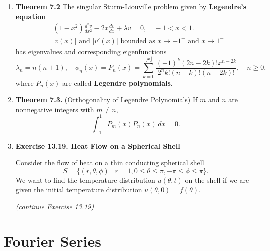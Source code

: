 \begin{enumerate}

\item \textbf{Theorem 7.2} The singular Sturm-Liouville problem given by \textbf{Legendre's equation}
\[
\begin{aligned}
& (1-x^{2})\frac{d^{2}v}{dx^{2}}-2x\frac{dv}{dx}+\lambda  v=0, \quad -1<x<1. \\
& |v(x)| \text{  and  } |v'(x)| \text{  bounded as  } x\to -1^{+} \text{  and  } x\to 1^{-}
\end{aligned}
\]
has eigenvalues and corresponding eigenfunctions
\[\lambda_{n}= n(n+1), \quad \phi_{n}(x)=P_{n}(x)=\sum_{k=0}^{\lfloor x \rfloor} \frac{(-1)^{k}(2n-2k)!x^{n-2k}}{2^{n}k!(n-k)!(n-2k)!}, \quad n\geq 0,\]
where $P_{n}(x)$ are called \textbf{Legendre polynomials}.

\item \textbf{Theorem 7.3.} (Orthogonality of Legendre Polynomials) If $m$ and $n$ are nonnegative integers with $m \neq n$,
\[\int_{-1}^{1}P_{m}(x)P_{n}(x)\,dx = 0.\]

\newpage

\item \textbf{Exercise 13.19. Heat Flow on a Spherical Shell}

Consider the flow of heat on a thin conducting spherical shell
\[S = \{ (r,\theta, \phi) \mid r = 1, 0 \leq \theta \leq \pi, −\pi \leq \phi \leq \pi \}. \]
We want to find the temperature distribution $u(\theta, t)$ on the shell if we are given the initial temperature distribution $u(\theta, 0) = f (\theta)$.

\newpage \textit{(continue Exercise 13.19)}


\end{enumerate}

\newpage

\section{Fourier Series}

